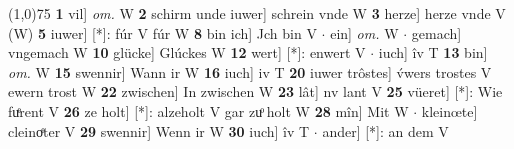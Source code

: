 \documentclass[8pt,a4paper,notitlepage]{article}
\begin{document}
\begin{table}[ht]
\begin{minipage}[t]{0.5\linewidth}
\line(1,0){75} \newline
\textbf{1} vil] \textit{om.} W \textbf{2} schirm unde iuwer] schrein vnde W \textbf{3} herze] herze vnde V (W) \textbf{5} iuwer] [*]: fúr V fúr W \textbf{8} bin ich] Jch bin V  $\cdot$ ein] \textit{om.} W  $\cdot$ gemach] vngemach W \textbf{10} glücke] Glúckes W \textbf{12} wert] [*]: enwert V  $\cdot$ iuch] îv T \textbf{13} bin] \textit{om.} W \textbf{15} swennir] Wann ir W \textbf{16} iuch] iv T \textbf{20} iuwer trôstes] v́wers trostes V ewern trost W \textbf{22} zwischen] In zwischen W \textbf{23} lât] nv lant V \textbf{25} vüeret] [*]: Wie fuͤrent V \textbf{26} ze holt] [*]: alzeholt V gar zuͦ holt W \textbf{28} mîn] Mit W  $\cdot$ kleinœte] cleinoͤter V \textbf{29} swennir] Wenn ir W \textbf{30} iuch] îv T  $\cdot$ ander] [*]: an dem V \newline
\end{minipage}
\end{table}
\end{document}

